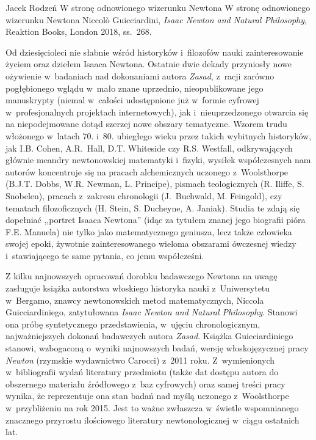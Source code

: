 \begin{recplenv}{Jacek Rodzeń}
	{W stronę odnowionego wizerunku Newtona}
	{W stronę odnowionego wizerunku Newtona}
	{Niccolò Guicciardini, \textit{Isaac Newton and Natural Philosophy}, Reaktion Books, London 2018, ss.~268.}
		




Od dziesięcioleci nie słabnie wśród historyków i~filozofów nauki zainteresowanie życiem oraz dziełem Isaaca Newtona.
Ostatnie dwie dekady przyniosły nowe ożywienie w~badaniach nad dokonaniami autora \textit{Zasad}, z~racji zarówno
pogłębionego wglądu w~mało znane uprzednio, nieopublikowane jego manuskrypty (niemal w~całości udostępnione już w~formie
cyfrowej w~profesjonalnych projektach internetowych), jak i~nieuprzedzonego otwarcia się na niepodejmowane dotąd
szerzej nowe obszary tematyczne. Wzorem trudu włożonego w~latach 70. i~80. ubiegłego wieku przez takich wybitnych
historyków, jak I.B. Cohen, A.R.~Hall, D.T. Whiteside czy R.S. Westfall, odkrywających głównie meandry newtonowskiej
matematyki i~fizyki, wysiłek współczesnych nam autorów koncentruje się na pracach alchemicznych uczonego z~Woolsthorpe
(B.J.T. Dobbs, W.R. Newman, L. Principe), pismach teologicznych (R. Iliffe, S. Snobelen), pracach z~zakresu chronologii
(J.~Buchwald, M. Feingold), czy tematach filozoficznych (H. Stein, S. Ducheyne, A. Janiak). Studia te zdają się
dopełniać ,,portret Isaaca Newtona'' (idąc za tytułem znanej jego biografii pióra F.E. Manuela) nie tylko jako
matematycznego geniusza, lecz także człowieka swojej epoki, żywotnie zainteresowanego wieloma obszarami ówczesnej
wiedzy i~stawiającego te same pytania, co jemu współcześni.

Z kilku najnowszych opracowań dorobku badawczego Newtona na uwagę zasługuje książka autorstwa włoskiego historyka
nauki z~Uniwersytetu w~Bergamo, znawcy newtonowskich metod matematycznych, Niccola Guicciardiniego, zatytułowana
\textit{Isaac Newton and Natural Philosophy}. Stanowi ona próbę syntetycznego przedstawienia, w~ujęciu chronologicznym,
najważniejszych dokonań badawczych autora \textit{Zasad}. Książka Guicciardiniego stanowi, wzbogaconą o~wyniki
najnowszych badań, wersję włoskojęzycznej pracy \textit{Newton} (rzymskie wydawnictwo Carocci) z~2011
roku. Z~wymienionych w~bibliografii wydań literatury przedmiotu (także dat dostępu autora do obszernego materiału
źródłowego z~baz cyfrowych) oraz samej treści pracy wynika, że reprezentuje ona stan badań nad myślą
uczonego z~Woolsthorpe w~przybliżeniu na rok 2015. Jest to ważne zwłaszcza w~świetle wspomnianego
znacznego przyrostu ilościowego literatury
newtonologicznej w~ciągu ostatnich lat. 


\end{recplenv}
